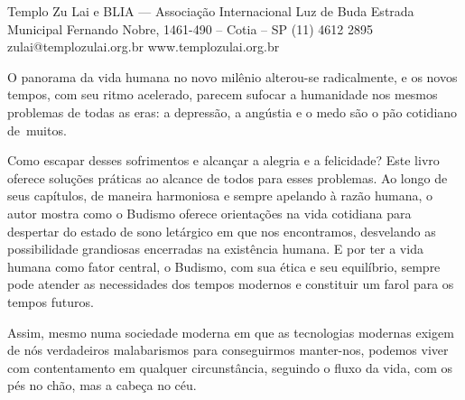 
Templo Zu Lai\crlf
e\crlf
BLIA — Associação Internacional Luz de Buda\crlf
Estrada Municipal Fernando Nobre, 1461-490 – Cotia – SP\crlf
{\small\symbol[phone]} (11) 4612 2895\crlf
{\small\symbol[envelope]} zulai@templozulai.org.br\crlf
{\tfa\symbol[web]} www.templozulai.org.br
\stopbuffer

O panorama da vida humana no novo milênio alterou-se radicalmente, e os novos tempos, com seu ritmo acelerado, parecem sufocar a humanidade nos mesmos problemas de todas as eras: a depressão, a angústia e o medo são o pão cotidiano de~muitos.

Como escapar desses sofrimentos e alcançar a alegria e a felicidade?
Este livro oferece soluções práticas ao alcance de todos para esses problemas.
Ao longo de seus capítulos, de maneira harmoniosa e sempre apelando à razão humana, o autor mostra como o Budismo oferece orientações na vida cotidiana para despertar do estado de sono letárgico em que nos encontramos, desvelando as possibilidade grandiosas encerradas na existência humana.
E por ter a vida humana como fator central, o Budismo, com sua ética e seu equilíbrio, sempre pode atender as necessidades dos tempos modernos e constituir um farol para os tempos futuros.

Assim, mesmo numa sociedade moderna em que as tecnologias modernas exigem de nós verdadeiros malabarismos para conseguirmos manter-nos, podemos viver com contentamento em qualquer circunstância, seguindo o fluxo da vida, com os pés no chão, mas a cabeça no céu.
\stopbuffer

